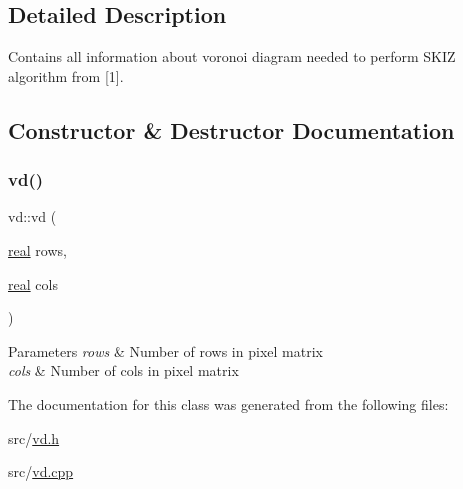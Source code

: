\subsection{Detailed Description}
Contains all information about voronoi diagram needed to perform S\+K\+IZ algorithm from \mbox{[}1\mbox{]}. 

\subsection{Constructor \& Destructor Documentation}
\mbox{\label{classvd_a765c16ee377a2a0f9651d555edd3a158}} 
\subsubsection{\texorpdfstring{vd()}{vd()}}
{\footnotesize\ttfamily vd\+::vd (\begin{DoxyParamCaption}\item[{\mbox{\hyperlink{typedefs_8cpp_a58a0c7cf2501f4492da833421be92547}{real}}}]{rows,  }\item[{\mbox{\hyperlink{typedefs_8cpp_a58a0c7cf2501f4492da833421be92547}{real}}}]{cols }\end{DoxyParamCaption})}


\begin{DoxyParams}{Parameters}
{\em rows} & Number of rows in pixel matrix \\
\hline
{\em cols} & Number of cols in pixel matrix \\
\hline
\end{DoxyParams}


The documentation for this class was generated from the following files\+:\begin{DoxyCompactItemize}
\item 
src/\mbox{\hyperlink{vd_8h}{vd.\+h}}\item 
src/\mbox{\hyperlink{vd_8cpp}{vd.\+cpp}}\end{DoxyCompactItemize}
